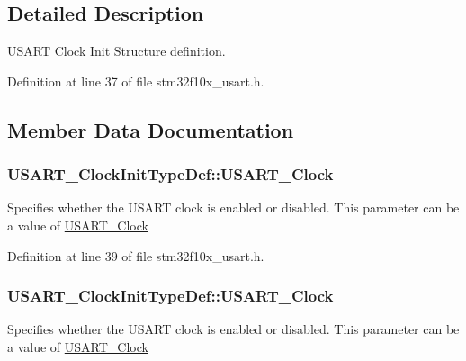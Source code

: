 \subsection{Detailed Description}
U\+S\+A\+RT Clock Init Structure definition. 

Definition at line 37 of file stm32f10x\+\_\+usart.\+h.



\subsection{Member Data Documentation}
\subsubsection[{\texorpdfstring{U\+S\+A\+R\+T\+\_\+\+Clock}{USART_Clock}}]{ U\+S\+A\+R\+T\+\_\+\+Clock\+Init\+Type\+Def\+::\+U\+S\+A\+R\+T\+\_\+\+Clock}\hypertarget{struct_u_s_a_r_t___clock_init_type_def_ab9130e2347fea03337c4376666cccd3c}{}\label{struct_u_s_a_r_t___clock_init_type_def_ab9130e2347fea03337c4376666cccd3c}
Specifies whether the U\+S\+A\+RT clock is enabled or disabled. This parameter can be a value of \hyperlink{group___u_s_a_r_t___clock}{U\+S\+A\+R\+T\+\_\+\+Clock} 

Definition at line 39 of file stm32f10x\+\_\+usart.\+h.

\subsubsection[{\texorpdfstring{U\+S\+A\+R\+T\+\_\+\+Clock}{USART_Clock}}]{ U\+S\+A\+R\+T\+\_\+\+Clock\+Init\+Type\+Def\+::\+U\+S\+A\+R\+T\+\_\+\+Clock}\hypertarget{struct_u_s_a_r_t___clock_init_type_def_a229ba7c3f9a4d6d56513e6899f6c6693}{}\label{struct_u_s_a_r_t___clock_init_type_def_a229ba7c3f9a4d6d56513e6899f6c6693}
Specifies whether the U\+S\+A\+RT clock is enabled or disabled. This parameter can be a value of \hyperlink{group___u_s_a_r_t___clock}{U\+S\+A\+R\+T\+\_\+\+Clock} 

